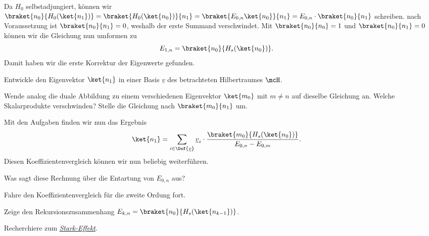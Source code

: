 \documentclass{subfile}
\begin{document}
            Da $H_0$ selbstadjungiert, können wir $\braket{n_0}{H_0(\ket{n_1})} = \braket{H_0(\ket{n_0})}{n_1} = \braket{E_{0,n}\ket{n_0}}{n_1} = E_{0,n}\cdot\braket{n_0}{n_1}$ schreiben. nach Voraussetzung ist $\braket{n_0}{n_1} = 0$, weshalb der erste Summand verschwindet. Mit $\braket{n_0}{n_0} = 1$ und $\braket{n_0}{n_1} = 0$ können wir die Gleichung nun umformen zu
            \[
                E_{1,n} = \braket{n_0}{H_s(\ket{n_0})}.
            \]
            Damit haben wir die erste Korrektur der Eigenwerte gefunden. 
            \begin{Aufgabe}
                \nr{} Entwickle den Eigenvektor $\ket{n_1}$ in einer Basis $\underline v$ des betrachteten Hilbertraumes $\mcH$. 

                \nr{} Wende analog die duale Abbildung zu einem verschiedenen Eigenvektor $\ket{m_0}$ mit $m\neq n$ auf dieselbe Gleichung an. Welche Skalarprodukte verschwinden? Stelle die Gleichung nach $\braket{m_0}{n_1}$ um. 
            \end{Aufgabe}
            \noindent Mit den Aufgaben finden wir nun das Ergebnis
            \[
                \ket{n_1} = \sum_{i\in\Def{\underline v}}\underline v_i\cdot \frac{\braket{m_0}{H_s(\ket{n_0})}}{E_{0,n} - E_{0,m}}.
            \]
            Diesen Koeffizientenvergleich können wir nun beliebig weiterführen. 
            \begin{Aufgabe}
                \nr{} Was sagt diese Rechnung über die Entartung von $E_{0,n}$ aus?

                \nr{} Fahre den Koeffizientenvergleich für die zweite Ordung fort. 

                \nr{} Zeige den Rekursionszusammenhang $E_{k,n} = \braket{n_0}{H_s(\ket{n_{k-1}})}$. 

                \nr{} Recherchiere zum \href{https://de.wikipedia.org/wiki/Stark-Effekt}{\emph{Stark-Effekt}}.
            \end{Aufgabe}
            
\end{document}
